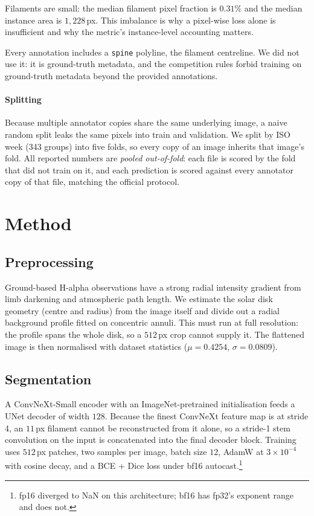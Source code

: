 \documentclass[conference]{IEEEtran}
\begin{document}
Filaments are small: the median filament pixel fraction is $0.31\%$ and the
median instance area is $1{,}228$\,px. This imbalance is why a pixel-wise loss
alone is insufficient and why the metric's instance-level accounting matters.

Every annotation includes a \texttt{spine} polyline, the filament centreline.
We did not use it: it is ground-truth metadata, and the competition rules forbid
training on ground-truth metadata beyond the provided annotations.

\paragraph{Splitting}
Because multiple annotator copies share the same underlying image, a naive
random split leaks the same pixels into train and validation. We split by ISO
week (343 groups) into five folds, so every copy of an image inherits that
image's fold. All reported numbers are \emph{pooled out-of-fold}: each file is
scored by the fold that did not train on it, and each prediction is scored
against every annotator copy of that file, matching the official protocol.

\section{Method}

\subsection{Preprocessing}

Ground-based H-alpha observations have a strong radial intensity gradient from
limb darkening and atmospheric path length. We estimate the solar disk geometry
(centre and radius) from the image itself and divide out a radial background
profile fitted on concentric annuli. This must run at full resolution: the
profile spans the whole disk, so a $512$\,px crop cannot supply it. The
flattened image is then normalised with dataset statistics
($\mu=0.4254$, $\sigma=0.0809$).

\subsection{Segmentation}

A ConvNeXt-Small encoder with an ImageNet-pretrained initialisation feeds a UNet
decoder of width $128$. Because the finest ConvNeXt feature map is at stride 4,
an $11$\,px filament cannot be reconstructed from it alone, so a stride-1 stem
convolution on the input is concatenated into the final decoder block. Training
uses $512$\,px patches, two samples per image, batch size $12$, AdamW at
$3\times10^{-4}$ with cosine decay, and a BCE + Dice loss under bf16
autocast.\footnote{fp16 diverged to NaN on this architecture; bf16 has fp32's
exponent range and does not.}
\end{document}
